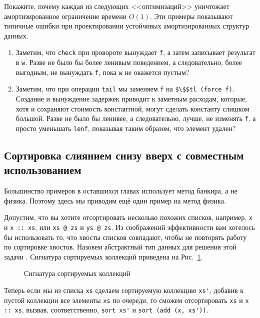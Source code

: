 \begin{exercise}\label{ex:6.6}
  Покажите, почему каждая из следующих <<оптимизаций>> уничтожает
  амортизированное ограничение времени $O(1)$. Эти примеры показывают
  типичные ошибки при проектировании устойчивых амортизированных
  структур данных.
  \begin{enumerate}
  \item Заметим, что \lstinline!check! при провороте вынуждает
    \lstinline!f!, а затем записывает результат в \lstinline!w!. Разве не
    было бы более ленивым поведением, а следовательно, более выгодным,
    не вынуждать \lstinline!f!, пока \lstinline!w! не окажется пустым?
  \item Заметим, что при операции \lstinline!tail! мы заменяем
    \lstinline!f! на \lstinline!$\$$tl (force f)!. Создание и
    вынуждение задержек приводит к заметным расходам, которые, хотя и
    сохраняют стоимость константной, могут сделать константу слишком
    большой. Разве не было бы ленивее, а следовательно, лучше, не изменять
    \lstinline!f!, а просто уменьшать \lstinline!lenf!, показывая
    таким образом, что элемент удален?
  \end{enumerate}
\end{exercise}

\subsection{Сортировка слиянием снизу вверх с совместным
  использованием}
\label{sc:6.4.3}

Большинство примеров в оставшихся главах использует метод банкира, а
не физика. Поэтому здесь мы приводим ещё один пример на метод физика.

Допустим, что вы хотите отсортировать несколько похожих списков,
например, \lstinline!x! и \lstinline!x :: xs!, или \lstinline!xs @ zs! и
\lstinline!ys @ zs!. Из соображений эффективности вам хотелось бы
использовать то, что хвосты списков совпадают, чтобы не повторять
работу по сортировке хвостов.  Назовем абстрактный тип данных для
решения этой задачи . Сигнатура сортируемых коллекций приведена на
Рис.~\ref{fig:6.4}.

\begin{figure}
  \centering
  
  \caption{Сигнатура сортируемых коллекций}
  \label{fig:6.4}
\end{figure}

Теперь если мы из списка \lstinline!xs! сделаем сортируемую коллекцию
\lstinline!xs'!, добавив к пустой коллекции все элементы
\lstinline!xs! по очереди, то сможем отсортировать \lstinline!xs! и
\lstinline!x :: xs!, вызвав, соответственно, \lstinline!sort xs'! и
\lstinline!sort (add (x, xs'))!.

